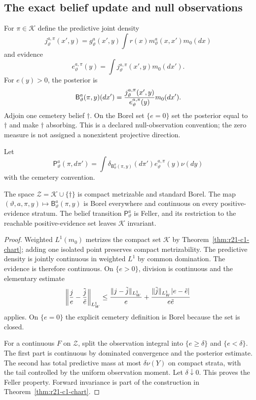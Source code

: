 \subsection{The exact belief update and null observations}

For $\pi\in\mathcal K$ define the predictive joint density
\[
 j_{\vartheta}^{a,\pi}(x',y)=
 g_{\vartheta}^{a}(x',y)
 \int r(x)m_{\vartheta}^{a}(x,x')m_0(dx)
\]
and evidence
\[
 e_{\vartheta}^{a,\pi}(y)=
 \int j_{\vartheta}^{a,\pi}(x',y)m_0(dx').
\]
For $e(y)>0$, the posterior is
\[
 \mathsf B_{\vartheta}^{a}(\pi,y)(dx')=
 {j_{\vartheta}^{a,\pi}(x',y)\over e_{\vartheta}^{a,\pi}(y)}m_0(dx').
\]
Adjoin one cemetery belief $\dagger$.  On the Borel set $\{e=0\}$ set the
posterior equal to $\dagger$ and make $\dagger$ absorbing.  This is a declared
null-observation convention; the zero measure is not assigned a nonexistent
projective direction.

Let
\[
 \mathsf P_{\vartheta}^{a}(\pi,d\pi')
 =\int\delta_{\mathsf B_\vartheta^a(\pi,y)}(d\pi')
       e_\vartheta^{a,\pi}(y)\nu(dy)
\]
with the cemetery convention.

\begin{theorem}
\label{thm:r21-c1-filter}
The space $\mathcal Z=\mathcal K\cup\{\dagger\}$ is compact metrizable and
standard Borel.  The map $(\vartheta,a,\pi,y)\mapsto
\mathsf B_\vartheta^a(\pi,y)$ is Borel everywhere and continuous on every
positive-evidence stratum.  The belief transition
$\mathsf P_\vartheta^a$ is Feller, and its restriction to the reachable
positive-evidence set leaves $\mathcal K$ invariant.
\end{theorem}

\begin{proof}
Weighted $L^1(m_0)$ metrizes the compact set $\mathcal K$ by
Theorem~\ref{thm:r21-c1-chart}; adding one isolated point preserves compact
metrizability.  The predictive density is jointly continuous in weighted
$L^1$ by common domination.  The evidence is therefore continuous.  On
$\{e>0\}$, division is continuous and the elementary estimate
\[
 \left\|{j\over e}-{\tilde j\over\tilde e}\right\|_{L^1_W}
 \le {\|j-\tilde j\|_{L^1_W}\over e}
 +{\|\tilde j\|_{L^1_W}|e-\tilde e|\over e\tilde e}
\]
applies.  On $\{e=0\}$ the explicit cemetery definition is Borel because the
set is closed.

For a continuous $F$ on $\mathcal Z$, split the observation integral into
$\{e\ge\delta\}$ and $\{e<\delta\}$.  The first part is continuous by dominated
convergence and the posterior estimate.  The second has total predictive mass
at most $\delta\nu(Y)$ on compact strata, with the tail controlled by the
uniform observation moment.  Let $\delta\downarrow0$.  This proves the Feller
property.  Forward invariance is part of the construction in
Theorem~\ref{thm:r21-c1-chart}.
\end{proof}

